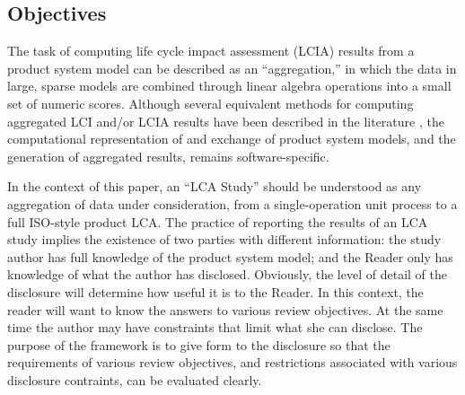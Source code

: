 \subsection{Objectives}

The task of computing life cycle impact assessment (LCIA) results from a product system model can be described as an ``aggregation,'' in which the data in large, sparse models are combined through linear algebra operations into a small set of numeric scores.  Although several equivalent methods for computing aggregated LCI and/or LCIA results have been described in the literature \citep{Suh_2005, Peters_2007}, the computational representation of and exchange of product system models, and the generation of aggregated results, remains software-specific.  

In the context of this paper, an ``LCA Study'' should be understood as any aggregation of data under consideration, from a single-operation unit process to a full ISO-style product LCA.  The practice of reporting the results of an LCA study implies the existence of two parties with different information: the study author has full knowledge of the product system model; and the Reader only has knowledge of what the author has disclosed.  Obviously, the level of detail of the disclosure will determine how useful it is to the Reader.  In this context, the reader will want to know the answers to various review objectives.  
At the same time the author may have constraints that limit what she can disclose.  The purpose of the framework is to give form to the disclosure so that the requirements of various review objectives, and restrictions associated with various disclosure contraints, can be evaluated clearly.



